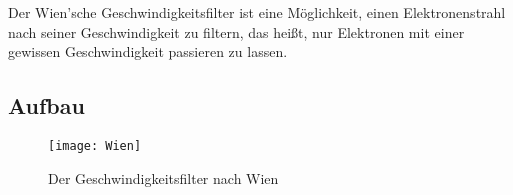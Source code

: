 




%
%	





Der Wien'sche Geschwindigkeitsfilter ist eine Möglichkeit, einen Elektronenstrahl nach seiner Geschwindigkeit zu filtern, das heißt, nur Elektronen mit einer gewissen Geschwindigkeit passieren zu lassen.

\subsection{Aufbau}

\begin{figure}[h!]
	\centering
	\vspace*{-10pt}
	\texttt{[image: Wien]}
	\caption{Der Geschwindigkeitsfilter nach Wien}
	\label{fig:Wien}
\end{figure}

